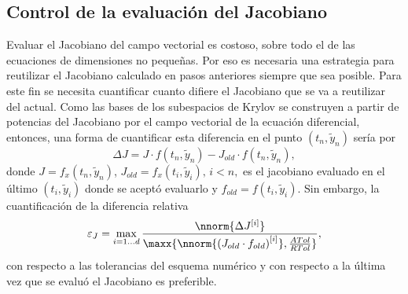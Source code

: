 \subsection{Control de la evaluaci\'on del Jacobiano}\label{jaccontrol}
 Evaluar el Jacobiano del campo vectorial es costoso, sobre todo el de las ecuaciones de dimensiones no pequeñas. Por eso
 es necesaria una estrategia para reutilizar el Jacobiano calculado en pasos anteriores siempre que sea posible. Para este fin se
 necesita cuantificar cuanto difiere el Jacobiano que se va a reutilizar del actual. Como las bases de los
 subespacios de Krylov se construyen a partir de potencias del Jacobiano por el campo vectorial de la ecuaci\'on
 diferencial, entonces, una forma de cuantificar esta diferencia en el punto $(t_n,\widetilde{y}_n)$ sería por  
 \begin{equation*}
 	\Delta J = J\cdot f(t_n,\widetilde{y}_n) - J_{old}\cdot f(t_n,\widetilde{y}_n),
 \end{equation*}
donde $J=f_x(t_n,\widetilde{y}_n)$, $J_{old}=f_x(t_i,\widetilde{y}_i),\, i<n,$ es el jacobiano evaluado en el \'ultimo
$(t_i,\widetilde{y}_i)$ donde se acept\'o evaluarlo y $f_{old} = f(t_i,\widetilde{y}_i)$. Sin embargo, la cuantificación de la diferencia relativa 
\begin{equation}\label{jerror}
	\varepsilon_J = \max_{i=1\ldots d}\frac{\nnorm{\Delta J^{[i]}}}
	{\maxx{\nnorm{ \left(J_{old}\cdot f_{old}\right)^{[i]} } ,\frac{ATol}{RTol}}},
\end{equation}
con respecto a las tolerancias del esquema numérico y con respecto a la \'ultima vez que se evalu\'o el Jacobiano es preferible.

